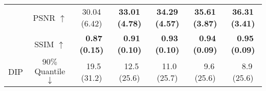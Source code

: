 \begin{table*}[!tb]
{\begin{tabular}{l c ccccc}
\rowcolor{Gray}
& \small{PSNR $\uparrow$} & \small{30.04 \small{(6.42)}} & \textbf{\small{33.01 \small{(4.78)}}} & \textbf{\small{34.29 \small{(4.57)}}} & \textbf{\small{35.61 \small{(3.87)}}} & \textbf{\small{36.31 \small{(3.41)}}} \\
\rowcolor{Gray}
& \small{SSIM $\uparrow$} & \textbf{\small{~0.87 \small{(0.15)}}} & \textbf{\small{~0.91 \small{(0.10)}}} & \textbf{\small{~0.93 \small{(0.10)}}} & \textbf{\small{~0.94 \small{(0.09)}}} & \textbf{\small{~0.95 \small{(0.09)}}} \\
\rowcolor{Gray}
\small{DIP} & \small{$90\%$ Quantile $\downarrow$} & \small{~19.5 \small{(31.2)}} & \small{~12.5 \small{(25.6)}} & \small{~11.0 \small{(25.7)}} & \small{~~9.6 \small{(25.6)}} & \small{~~8.9 \small{(25.6)}} \\




\end{tabular}}
\end{table*}
